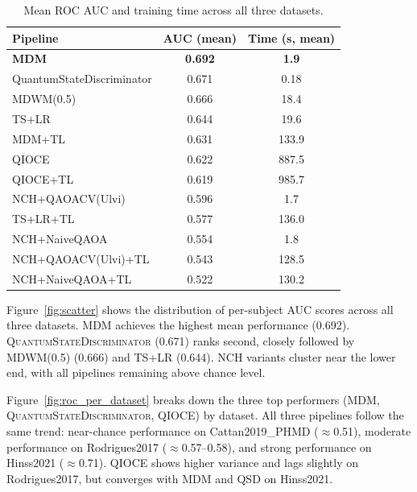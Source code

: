 \documentclass{article}
\begin{document}
\begin{table}[h]
  \caption{Mean ROC AUC and training time across all three datasets.}
  \label{tab:auc}
  \centering
  \begin{tabular}{lcc}
    \toprule
    Pipeline & AUC (mean) & Time (s, mean) \\
    \midrule
    \textbf{MDM}                             & \textbf{0.692} & \textbf{1.9} \\
    QuantumStateDiscriminator               & 0.671          & 0.18 \\
    MDWM(0.5)                               & 0.666          & 18.4 \\
    TS+LR                                   & 0.644          & 19.6 \\
    MDM+TL                                  & 0.631          & 133.9 \\
    QIOCE                                   & 0.622          & 887.5 \\
    QIOCE+TL                                & 0.619          & 985.7 \\
    NCH+QAOACV(Ulvi)                        & 0.596          & 1.7 \\
    TS+LR+TL                                & 0.577          & 136.0 \\
    NCH+NaiveQAOA                           & 0.554          & 1.8 \\
    NCH+QAOACV(Ulvi)+TL                     & 0.543          & 128.5 \\
    NCH+NaiveQAOA+TL                        & 0.522          & 130.2 \\
    \bottomrule
  \end{tabular}
\end{table}

Figure~\ref{fig:scatter} shows the distribution of per-subject AUC scores
across all three datasets.  MDM achieves the highest mean performance (0.692).
\textsc{QuantumStateDiscriminator} (0.671) ranks second, closely followed by
MDWM(0.5) (0.666) and TS+LR (0.644).  NCH variants cluster near the lower end,
with all pipelines remaining above chance level.

Figure~\ref{fig:roc_per_dataset} breaks down the three top performers
(MDM, \textsc{QuantumStateDiscriminator}, QIOCE) by dataset.
All three pipelines follow the same trend: near-chance performance on
Cattan2019\_PHMD ($\approx$0.51), moderate performance on Rodrigues2017
($\approx$0.57--0.58), and strong performance on Hinss2021
($\approx$0.71).  QIOCE shows higher variance and lags slightly on
Rodrigues2017, but converges with MDM and QSD on Hinss2021.
\end{document}
